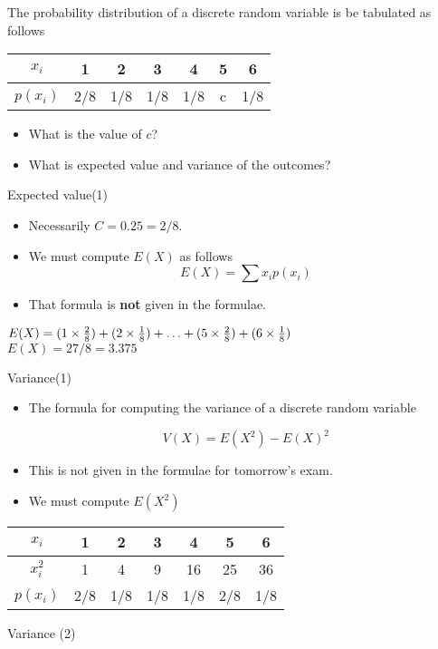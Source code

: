 \documentclass[]{report}
\begin{document}
{{{{{{{	The probability distribution of a discrete random variable is be tabulated as follows
	
	\begin{center}
		\begin{tabular}{|c||c|c|c|c|c|c|}
			\hline
			$x_i$  & 1 & 2 & 3 & 4 & 5 & 6 \\\hline
			$p(x_i)$ & 2/8 & 1/8& 1/8 & 1/8& c & 1/8\\
			\hline
		\end{tabular}
	\end{center}
	
	\begin{itemize}
		\item What is the value of $c$?
		\item What is expected value and variance of the outcomes?
	\end{itemize}
}
{
	{Expected value(1)}
	\begin{itemize}
		\item Necessarily $C =0.25 = 2/8$. \\
		\item We must compute $E(X)$ as follows \[E(X) = \sum x_i p(x_i) \]
		\item That formula is \textbf{not} given in the formulae.
	\end{itemize}
	\bigskip
	$E(X) = (1 \times {2\over8}) + (2 \times {1 \over 8}) +  \ldots + (5 \times {2 \over 8}) + (6 \times {1 \over 8})$\\\bigskip
	$E(X) = 27/8 = 3.375$\bigskip
}
{
	{Variance(1)}
	\begin{itemize}
		\item The formula for computing the variance of a discrete random variable
		
		\[ V(X) = E(X^2) - E(X)^2 \]
		
		\item This is not given in the formulae for tomorrow's exam.
		
		\item We must compute $E(X^2)$
	\end{itemize}
	
	\begin{center}
		\begin{tabular}{|c||c|c|c|c|c|c|}
			\hline
			$x_i$  & 1 & 2 & 3 & 4 & 5 & 6 \\\hline
			$x^2_i$  & 1 & 4 & 9 & 16 & 25 & 36 \\\hline
			$p(x_i)$ & 2/8 & 1/8& 1/8 & 1/8& 2/8 & 1/8\\
			\hline
		\end{tabular}
	\end{center}
}
{
	{Variance (2)}
	
}}}}}}}
\end{document}
